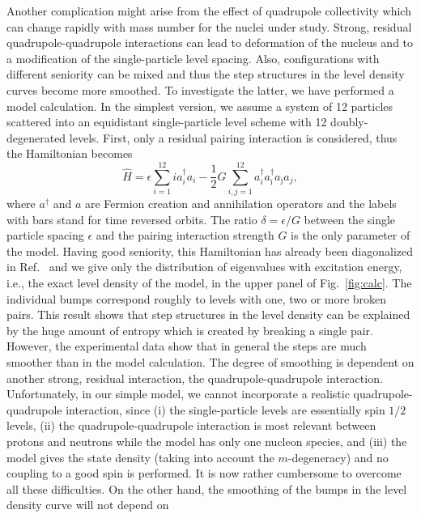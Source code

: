 \begin{multicols}{2}
Another complication might arise from the effect of quadrupole collectivity 
which can change rapidly with mass number for the nuclei under study. Strong, 
residual quadrupole-quadrupole interactions can lead to deformation of the 
nucleus and to a modification of the single-particle level spacing. Also, 
configurations with different seniority can be mixed and thus the step 
structures in the level density curves become more smoothed. To investigate the
latter, we have performed a model calculation. In the simplest version, we 
assume a system of 12 particles scattered into an equidistant single-particle 
level scheme with 12 doubly-degenerated levels. First, only a residual pairing 
interaction is considered, thus the Hamiltonian becomes
\begin{equation}
\widehat{H}=\epsilon\sum_{i=1}^{12}ia_i^\dagger a_i-\frac{1}{2}G
\sum_{i,j=1}^{12}a_i^\dagger a_{\bar{\imath}}^\dagger a_{\bar{\jmath}}a_j,
\label{eq:pairham}
\end{equation}
where $a^\dagger$ and $a$ are Fermion creation and annihilation operators and 
the labels with bars stand for time reversed orbits. The ratio 
$\delta=\epsilon/G$ between the single particle spacing $\epsilon$ and the 
pairing interaction strength $G$ is the only parameter of the model. Having 
good seniority, this Hamiltonian has already been diagonalized in Ref.\ 
\cite{GB00} and we give only the distribution of eigenvalues with excitation 
energy, i.e., the exact level density of the model, in the upper panel of Fig.\
\ref{fig:calc}. The individual bumps correspond roughly to levels with one, two
or more broken pairs. This result shows that step structures in the level 
density can be explained by the huge amount of entropy which is created by 
breaking a single pair. However, the experimental data show that in general the
steps are much smoother than in the model calculation. The degree of smoothing 
is dependent on another strong, residual interaction, the quadrupole-quadrupole
interaction. Unfortunately, in our simple model, we cannot incorporate a 
realistic quadrupole-quadrupole interaction, since (i) the single-particle 
levels are essentially spin $1/2$ levels, (ii) the quadrupole-quadrupole 
interaction is most relevant between protons and neutrons while the model has
only one nucleon species, and (iii) the model gives the state density (taking 
into account the $m$-degeneracy) and no coupling to a good spin is performed.
It is now rather cumbersome to overcome all these difficulties. On the other 
hand, the smoothing of the bumps in the level density curve will not depend on

\end{multicols}
